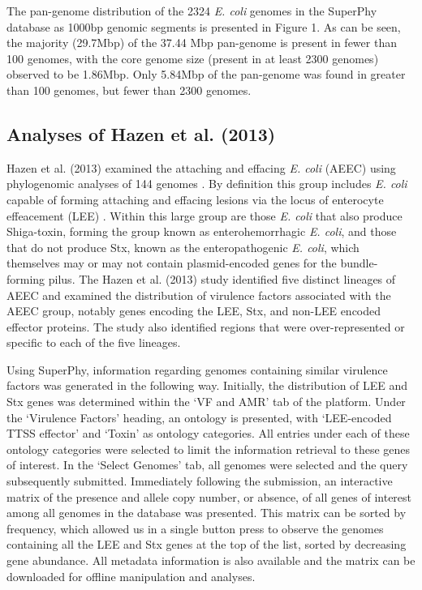 \documentclass{bmcart}
\begin{document}
The pan-genome distribution of the 2324 \textit{E. coli} genomes in the SuperPhy database as 1000bp genomic segments is presented in Figure 1. As can be seen, the majority (29.7Mbp) of the 37.44 Mbp pan-genome is present in fewer than 100 genomes, with the core genome size (present in at least 2300 genomes) observed to be 1.86Mbp. Only 5.84Mbp of the pan-genome was found in greater than 100 genomes, but fewer than 2300 genomes.

\subsection{Analyses of Hazen et al. (2013)}
Hazen et al. (2013) examined the attaching and effacing \textit{E. coli} (AEEC) using phylogenomic analyses of 144 genomes \cite{hazen_refining_2013}. By definition this group includes \textit{E. coli} capable of forming attaching and effacing lesions via the locus of enterocyte effeacement (LEE) \cite{croxen_recent_2013}. Within this large group are those \textit{E. coli} that also produce Shiga-toxin, forming the group known as enterohemorrhagic \textit{E. coli}, and those that do not produce Stx, known as  the enteropathogenic \textit{E. coli}, which themselves may or may not contain plasmid-encoded genes for the bundle-forming pilus.  The Hazen et al. (2013) study identified five distinct lineages of AEEC and examined the distribution of virulence factors associated with the AEEC group, notably genes encoding the LEE, Stx, and non-LEE encoded effector proteins. The study also identified regions that were over-represented or specific to each of the five lineages.

Using SuperPhy, information regarding genomes containing similar virulence factors was generated in the following way. Initially, the distribution of LEE and Stx genes was determined within the `VF and AMR' tab of the platform. Under the `Virulence Factors' heading, an ontology is presented, with `LEE-encoded TTSS effector' and `Toxin' as ontology categories. All entries under each of these ontology categories were selected to limit the information retrieval to these genes of interest. In the `Select Genomes' tab, all genomes were selected and the query subsequently submitted. Immediately following the submission, an interactive matrix of the presence and allele copy number, or absence, of all genes of interest among all genomes in the database was presented. This matrix can be sorted by frequency, which allowed us in a single button press to observe the genomes containing all the LEE and Stx genes at the top of the list, sorted by decreasing gene abundance. All metadata information is also available and the matrix can be downloaded for offline manipulation and analyses.
\end{document}
